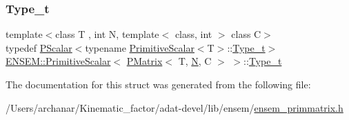 \mbox{\label{structENSEM_1_1PrimitiveScalar_3_01PMatrix_3_01T_00_01N_00_01C_01_4_01_4_a86d4d1fddfae8c6be655a4b763d59f64}} 
\subsubsection{\texorpdfstring{Type\_t}{Type\_t}\hspace{0.1cm}{\footnotesize\ttfamily [3/3]}}
{\footnotesize\ttfamily template$<$class T , int N, template$<$ class, int $>$ class C$>$ \\
typedef \mbox{\hyperlink{classENSEM_1_1PScalar}{P\+Scalar}}$<$typename \mbox{\hyperlink{structENSEM_1_1PrimitiveScalar}{Primitive\+Scalar}}$<$T$>$\+::\mbox{\hyperlink{structENSEM_1_1PrimitiveScalar_3_01PMatrix_3_01T_00_01N_00_01C_01_4_01_4_a86d4d1fddfae8c6be655a4b763d59f64}{Type\+\_\+t}}$>$ \mbox{\hyperlink{structENSEM_1_1PrimitiveScalar}{E\+N\+S\+E\+M\+::\+Primitive\+Scalar}}$<$ \mbox{\hyperlink{classENSEM_1_1PMatrix}{P\+Matrix}}$<$ T, \mbox{\hyperlink{adat__devel_2lib_2hadron_2operator__name__util_8cc_a7722c8ecbb62d99aee7ce68b1752f337}{N}}, C $>$ $>$\+::\mbox{\hyperlink{structENSEM_1_1PrimitiveScalar_3_01PMatrix_3_01T_00_01N_00_01C_01_4_01_4_a86d4d1fddfae8c6be655a4b763d59f64}{Type\+\_\+t}}}



The documentation for this struct was generated from the following file\+:\begin{DoxyCompactItemize}
\item 
/\+Users/archanar/\+Kinematic\+\_\+factor/adat-\/devel/lib/ensem/\mbox{\hyperlink{adat-devel_2lib_2ensem_2ensem__primmatrix_8h}{ensem\+\_\+primmatrix.\+h}}\end{DoxyCompactItemize}
